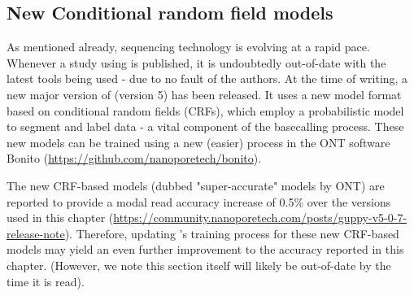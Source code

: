 \subsection{New Conditional random field models}
As mentioned already, \ont{} sequencing technology is evolving at a rapid pace. Whenever a study using \ont{} is published, it is undoubtedly out-of-date with the latest tools being used - due to no fault of the authors. At the time of writing, a new major version of \guppy{} (version 5) has been released. It uses a new model format based on conditional random fields (CRFs), which employ a probabilistic model to segment and label data \cite{Lafferty2001} - a vital component of the basecalling process. These new models can be trained using a new (easier) process in the ONT software Bonito (\url{https://github.com/nanoporetech/bonito}).

The new CRF-based models (dubbed "super-accurate" models by ONT) are reported to provide a modal read accuracy increase of 0.5\% over the \guppy{} versions used in this chapter (\url{https://community.nanoporetech.com/posts/guppy-v5-0-7-release-note}). Therefore, updating \tubby{}'s training process for these new CRF-based models may yield an even further improvement to the accuracy reported in this chapter. (However, we note this section itself will likely be out-of-date by the time it is read). 


